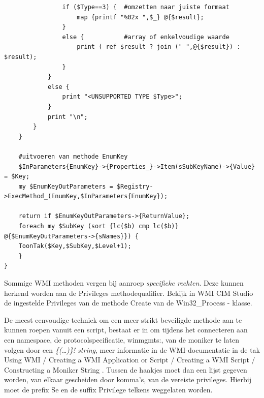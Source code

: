 \documentclass[11pt,a4paper]{report}
\begin{document}
\begin{enumerate}[resume]
\begin{lstlisting}
				if ($Type==3) {  #omzetten naar juiste formaat
					map {printf "%02x ",$_} @{$result};
				}
				else {           #array of enkelvoudige waarde
					print ( ref $result ? join (" ",@{$result}) : $result);
				}
			}
			else {
				print "<UNSUPPORTED TYPE $Type>";
			}
			print "\n";
		}
	}
	
	#uitvoeren van methode EnumKey
	$InParameters{EnumKey}->{Properties_}->Item(sSubKeyName)->{Value} = $Key;
	my $EnumKeyOutParameters = $Registry->ExecMethod_(EnumKey,$InParameters{EnumKey});
	
	return if $EnumKeyOutParameters->{ReturnValue};
	foreach my $SubKey (sort {lc($b) cmp lc($b)} @{$EnumKeyOutParameters->{sNames}}) {
	ToonTak($Key,$SubKey,$Level+1);
	}
}
	\end{lstlisting}	
\end{enumerate}
Sommige WMI methoden vergen bij aanroep \textit{specifieke rechten}. Deze kunnen herkend worden aan de Privileges methodequalifier. Bekijk in WMI CIM Studio de ingestelde Privileges van de methode Create van de Win32\_Process - klasse.
\par De meest eenvoudige techniek om een meer strikt beveiligde methode aan te kunnen roepen vanuit een script, bestaat er in om tijdens het connecteren aan een namespace, de protocolspecificatie, winmgmts:, van de moniker te laten volgen door een \textit{\{(…)\}! string}, meer informatie in de WMI-documentatie in de tak Using WMI / Creating a WMI Application or Script / Creating a WMI Script / Constructing a Moniker String . Tussen de haakjes moet dan een lijst gegeven worden, van elkaar gescheiden door komma's, van de vereiste privileges. Hierbij moet de prefix Se en de suffix Privilege telkens weggelaten worden.
\end{document}
